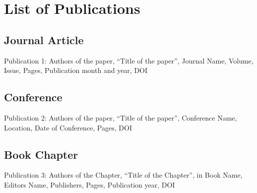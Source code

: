 ﻿\chapter*{List of Publications}

\section*{Journal Article}
Publication 1: Authors of the paper, “Title of the paper”, Journal Name, Volume, Issue, Pages, Publication month and year, DOI

\section*{Conference}
Publication 2: Authors of the paper, “Title of the paper”, Conference Name, Location, Date of Conference, Pages, DOI

\section*{Book Chapter}
Publication 3: Authors of the Chapter, “Title of the Chapter”, in Book Name, Editors Name, Publishers, Pages, Publication year, DOI
